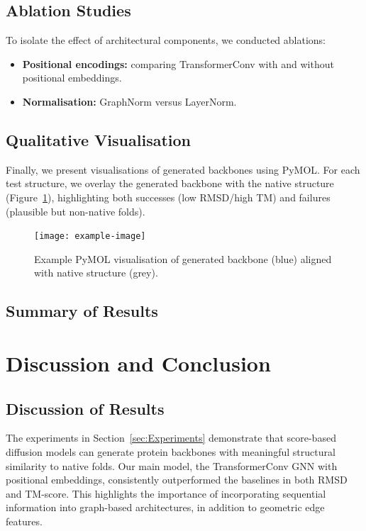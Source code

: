 \documentclass[a4paper,12pt]{article}
\begin{document}
\subsection{Ablation Studies}
\label{subsec:ablations}

To isolate the effect of architectural components, we conducted ablations:
\begin{itemize}
    \item \textbf{Positional encodings:} comparing TransformerConv with and without positional embeddings.
    \item \textbf{Normalisation:} GraphNorm versus LayerNorm.
\end{itemize}


\subsection{Qualitative Visualisation}\label{subsec:visualisation}
Finally, we present visualisations of generated backbones using PyMOL. For each test structure, we overlay the generated backbone with the native structure (Figure~\ref{fig:pymol-example}), highlighting both successes (low RMSD/high TM) and failures (plausible but non-native folds).

\begin{figure}[htbp]
    \centering
    \texttt{[image: example-image]}
    \caption{Example PyMOL visualisation of generated backbone (blue) aligned with native structure (grey).}
    \label{fig:pymol-example}
\end{figure}

\subsection{Summary of Results}\label{subsec:results-summary}

\clearpage

\section{Discussion and Conclusion}\label{sec:Discussion_and_Conclusion}
\subsection{Discussion of Results}\label{subsec:discussion-results}
The experiments in Section~\ref{sec:Experiments} demonstrate that score-based diffusion models can generate protein backbones with meaningful structural similarity to native folds. Our main model, the TransformerConv GNN with positional embeddings, consistently outperformed the baselines in both RMSD and TM-score. This highlights the importance of incorporating sequential information into graph-based architectures, in addition to geometric edge features. 
\end{document}
